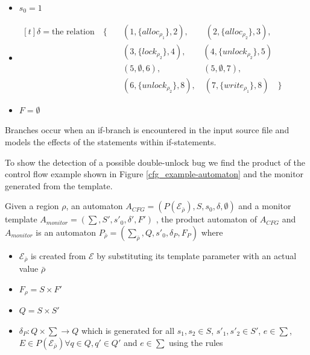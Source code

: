 \begin{itemize}
    \item $s_0 = 1$ 
    \item {
        $
            \begin{aligned}[t]
            \delta = \text{the relation} \quad \{ \quad 
            & (1, \{alloc_{\rho_1}\}, 2), \quad \quad (2, \{alloc_{\rho_2}\}, 3), \\
            & (3, \{lock_{\rho_2}\}, 4), \quad \quad (4, \{unlock_{\rho_2}\}, 5) \\
            & (5, \emptyset, 6), \quad \quad \quad \quad \quad (5, \emptyset, 7), \\
            & (6, \{unlock_{\rho_2}\}, 8), \quad (7, \{write_{\rho_1}\}, 8) \quad \}
            \end{aligned}
        $ 
    }
    \item $F = \emptyset$
\end{itemize}

\noindent Branches occur when an if-branch is encountered in the input source file and models the effects of the statements within if-statements.

\newpar To show the detection of a possible double-unlock bug we find the product of the control flow example shown in Figure \ref{cfg_example-automaton} and the monitor generated from the template. 

\newpar Given a region $\rho$, an automaton $A_{CFG} = (P(\mathcal{E}_{\bar{\rho}}), S, s_0, \delta, \emptyset)$ and a monitor template $A_{monitor} = (\sum, S', s'_0, \delta', F')$ , the product automaton of $A_{CFG}$ and $A_{monitor}$ is an automaton $P_{\bar{\rho}} = (\sum_{\bar{\rho}}, Q, s'_0, \delta_P, F_P)$ where 

\begin{itemize}
    \item $\mathcal{E}_{\bar{\rho}}$ is created from $\mathcal{E}$ by substituting its template parameter with an actual value $\bar{\rho}$
    \item $F_\rho = S \times F'$
    \item $Q = S \times S'$
    \item $\delta_P : Q \times \sum \rightarrow Q$ which is generated for all $s_1, s_2 \in S$, $s'_1, s'_2 \in S'$, $e \in \sum$, $E \in P(\mathcal{E}_{\bar{\rho}}) \forall q \in Q , q' \in Q'$ and $e \in \sum$ using the rules
\end{itemize}
    
\begin{center}
    \begin{prooftree}
    \end{prooftree}
    \hspace{2cm}
    \begin{prooftree}
    \end{prooftree}
\end{center}

